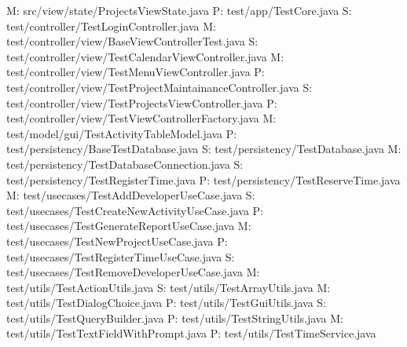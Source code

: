 M: src/view/state/ProjectsViewState.java
P: test/app/TestCore.java
S: test/controller/TestLoginController.java
M: test/controller/view/BaseViewControllerTest.java
S: test/controller/view/TestCalendarViewController.java
M: test/controller/view/TestMenuViewController.java
P: test/controller/view/TestProjectMaintainanceController.java
S: test/controller/view/TestProjectsViewController.java
P: test/controller/view/TestViewControllerFactory.java
M: test/model/gui/TestActivityTableModel.java
P: test/persistency/BaseTestDatabase.java
S: test/persistency/TestDatabase.java
M: test/persistency/TestDatabaseConnection.java
S: test/persistency/TestRegisterTime.java
P: test/persistency/TestReserveTime.java
M: test/usecases/TestAddDeveloperUseCase.java
S: test/usecases/TestCreateNewActivityUseCase.java
P: test/usecases/TestGenerateReportUseCase.java
M: test/usecases/TestNewProjectUseCase.java
P: test/usecases/TestRegisterTimeUseCase.java
S: test/usecases/TestRemoveDeveloperUseCase.java
M: test/utils/TestActionUtils.java
S: test/utils/TestArrayUtils.java
M: test/utils/TestDialogChoice.java
P: test/utils/TestGuiUtils.java
S: test/utils/TestQueryBuilder.java
P: test/utils/TestStringUtils.java
M: test/utils/TestTextFieldWithPrompt.java
P: test/utils/TestTimeService.java